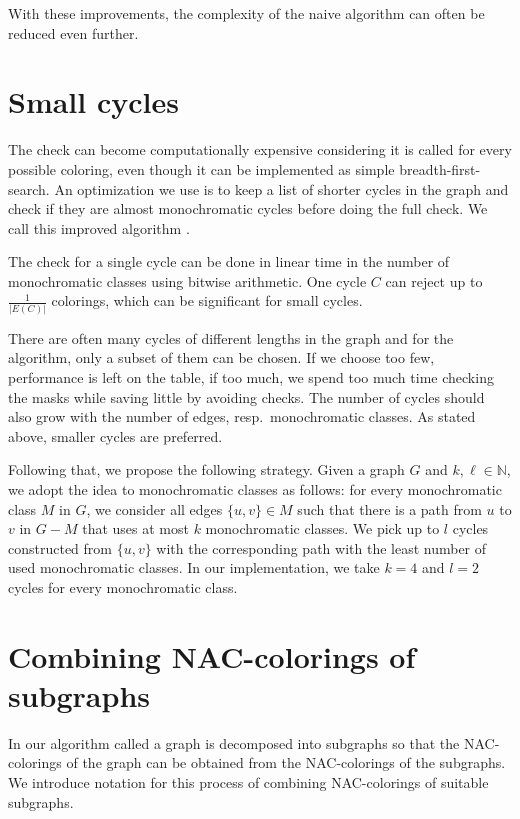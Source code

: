 With these improvements, the complexity of the naive algorithm can often be
reduced even further.

\section{Small cycles}%
\label{sec:small_cycles}

The check \IsNACColoring{} can become computationally expensive
considering it is called for every possible coloring,
even though it can be implemented as simple breadth-first-search.
An optimization we use is to keep a list of shorter cycles in the graph and
check if they are almost monochromatic cycles before doing the full check.
We call this improved \Naive{} algorithm \NaiveCycles{}.

The check for a single cycle can be done in linear time
in the number of monochromatic classes using bitwise arithmetic.
One cycle $C$ can reject up to $\frac{1}{|E(C)|}$ colorings,
which can be significant for small cycles.

There are often many cycles of different lengths in the graph
and for the algorithm, only a subset of them can be chosen.
If we choose too few, performance is left on the table, if too much,
we spend too much time checking the masks while saving little
by avoiding \IsNACColoring{} checks.
The number of cycles should also grow with the number of edges,
resp.\ monochromatic classes.
As stated above, smaller cycles are preferred.

Following that, we propose the following strategy.
Given a graph $G$ and $k,\ell\in \mathbb{N}$,
we adopt the idea to monochromatic classes as follows:
for every monochromatic class $M$ in $G$,
we consider all edges $\{u, v\} \in M$ such that there is a path from $u$ to $v$
in $G - M$ that uses at most $k$ monochromatic classes.
We pick up to $l$ cycles constructed from $\{u, v\}$ with the corresponding
path with the least number of used monochromatic classes.
In our implementation, we take $k=4$ and $l=2$ cycles for every monochromatic class.

\section{Combining NAC-colorings of subgraphs}%
\label{sec:combining}

In our algorithm called \Subgraphs{} a graph is decomposed into subgraphs so that
the NAC-colorings of the graph can be obtained from the NAC-colorings of the subgraphs.
We introduce notation for this process of combining NAC-colorings of suitable subgraphs.

